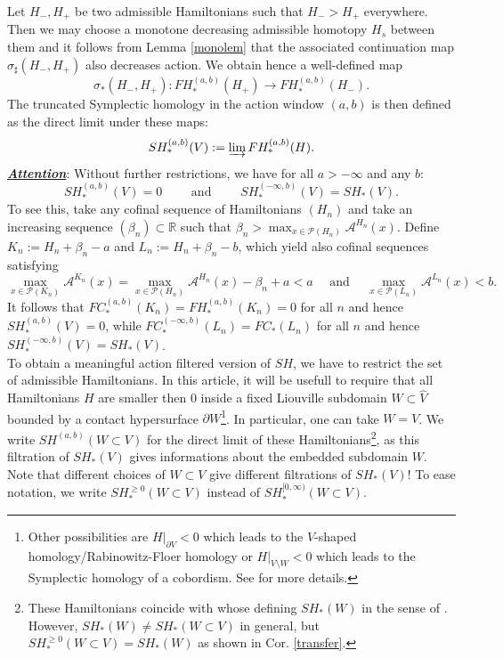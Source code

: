 \documentclass[a4paper,12pt,bibliography=totocnumbered,titlepage=false,abstracton,bookmarksnumbered=true]{scrartcl}
\theoremstyle{definition}
\begin{document}
Let $H_-,H_+$ be two admissible Hamiltonians such that $H_->H_+$ everywhere. Then we may choose a monotone decreasing admissible homotopy $H_s$ between them and it follows from Lemma \ref{monolem} that the associated continuation map $\sigma_\sharp(H_-,H_+)$ also decreases action. We obtain hence a well-defined map
\[\sigma_\ast(H_-,H_+): FH_\ast^{(a,b)}(H_+)\rightarrow FH_\ast^{(a,b)}(H_-).\]
The truncated Symplectic homology in the action window $(a,b)$ is then defined as the direct limit under these maps:
\[SH_\ast^{(a,b)}(V):=\varinjlim FH_\ast^{(a,b)}(H).\]
\underline{\textbf{\textit{Attention}}}: Without further restrictions, we have for all $a>-\infty$ and any $b$:
\[SH^{(a,b)}_\ast(V)=0\qquad\text{ and }\qquad SH^{(-\infty,b)}_\ast(V)=SH_\ast(V).\]
To see this, take any cofinal sequence of Hamiltonians $(H_n)$ and take an increasing sequence $(\beta_n)\subset\mathbb{R}$ such that $\displaystyle\beta_n>\max_{x\in\mathcal{P}(H_n)}\mathcal{A}^{H_n}(x)$. Define $K_n:=H_n+\beta_n-a$ and $L_n:=H_n+\beta_n-b$, which yield also cofinal sequences satisfying
\[\max_{x\in\mathcal{P}(K_n)}\mathcal{A}^{K_n}(x)=\max_{x\in\mathcal{P}(H_n)}\mathcal{A}^{H_n}(x)-\beta_n+a<a\quad\text{ and }\quad \max_{x\in\mathcal{P}(L_n)}\mathcal{A}^{L_n}(x)<b.\]
It follows that $FC^{(a,b)}_\ast(K_n)=FH_\ast^{(a,b)}(K_n)=0$ for all $n$ and hence $SH^{(a,b)}_\ast(V)=0$, while $FC_\ast^{(-\infty,b)}(L_n)=FC_\ast(L_n)$ for all $n$ and hence $SH^{(-\infty,b)}_\ast(V)=SH_\ast(V)$.\\ 
To obtain a meaningful action filtered version of $SH$, we have to restrict the set of admissible Hamiltonians. In this article, it will be usefull to require that all Hamiltonians $H$ are smaller then $0$ inside a fixed Liouville subdomain $W\subset \widehat{V}$ bounded by a contact hypersurface $\partial W$\footnote{Other possibilities are $H|_{\partial V}<0$ which leads to the $V$-shaped homology/Rabinowitz-Floer homology or $H|_{V\setminus W}<0$ which leads to the Symplectic homology of a cobordism. See \cite{CieOan} for more details.}. In particular, one can take $W=V$. We write $SH^{(a,b)}(W{\subset}V)$ for the direct limit of these Hamiltonians\footnote{These Hamiltonians coincide with whose defining $SH_\ast(W)$ in the sense of \cite{CieOan}. However, $SH_\ast(W)\neq SH_\ast(W{\subset}V)$ in general, but $SH^{\geq 0}_\ast(W{\subset}V)=SH_\ast(W)$ as shown in Cor. \ref{transfer}.}, as this filtration of $SH_\ast(V)$ gives informations about the embedded subdomain $W$. Note that different choices of $W\subset V$ give different filtrations of $SH_\ast(V)$! To ease notation, we write $SH^{\geq0}_\ast(W{\subset}V)$ instead of $SH^{[0,\infty)}_\ast(W{\subset}V)$.\\
\end{document}
